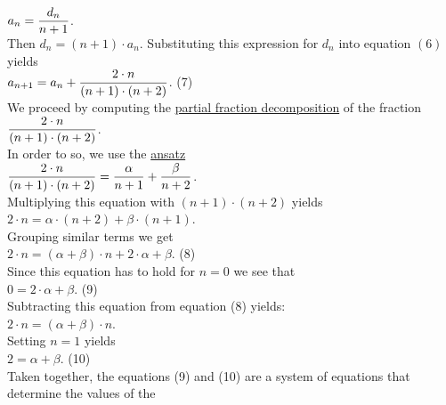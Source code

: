 \\[0.2cm]
\hspace*{1.3cm}
$\displaystyle a_n = \frac{d_n}{n+1}$. 
\\[0.2cm] 
Then $d_n = (n+1) \cdot a_n$.  Substituting this expression for $d_n$ into equation $(6)$ yields
\\[0.2cm]
\hspace*{1.3cm}
$\displaystyle a_{n+1} = a_{n} + \frac{2\cdot n}{(n+1)\cdot(n+2)}$.  \hspace*{\fill} (7)
\\[0.2cm]
We proceed by computing the 
\href{http://en.wikipedia.org/wiki/Partial_fraction}{partial fraction decomposition}
of the fraction
\\[0.2cm]
\hspace*{1.3cm}
$\displaystyle\frac{2\cdot n}{(n+1)\cdot(n+2)}$.
\\[0.2cm] 
In order to so, we use the \href{http://en.wikipedia.org/wiki/Ansatz}{ansatz}
\\[0.2cm]
\hspace*{1.3cm}
$\displaystyle\frac{2\cdot n}{(n+1)\cdot(n+2)} = \frac{\alpha}{n+1} + \frac{\beta}{n+2}$.
\\[0.2cm] 
Multiplying this equation with $(n+1) \cdot (n+2)$ yields
\\[0.2cm]
\hspace*{1.3cm}
$ 2\cdot n = \alpha \cdot (n+2) + \beta \cdot (n+1)$. 
\\[0.2cm]
Grouping similar terms we get
\\[0.2cm]
\hspace*{1.3cm}
$2\cdot n = (\alpha + \beta) \cdot n + 2 \cdot \alpha  + \beta$. \hspace*{\fill} (8)
\\[0.2cm]
Since this equation has to hold for $n = 0$ we see that
\\[0.2cm]
\hspace*{1.3cm}
$0 = 2 \cdot \alpha + \beta$.  \hspace*{\fill} (9)
\\[0.2cm]
Subtracting this equation from equation (8) yields:
\\[0.2cm]
\hspace*{1.3cm}
$2 \cdot n  =  (\alpha + \beta) \cdot n$.
\\[0.2cm]
Setting $n=1$ yields
\\[0.2cm]
\hspace*{1.3cm}
$2  =  \alpha + \beta$.  \hspace*{\fill} (10)
\\[0.2cm]
Taken together, the equations (9) and (10) are a system of equations that determine the values of the
